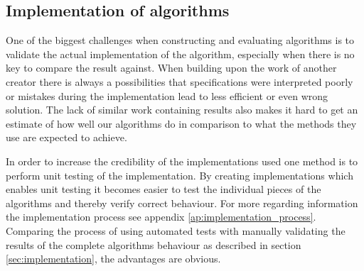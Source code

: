 \subsection{Implementation of algorithms }
One of the biggest challenges when constructing and evaluating algorithms is to validate the actual implementation of the algorithm, especially when there is no key to compare the result against. When building upon the work of another creator there is always a possibilities that specifications were interpreted poorly or mistakes during the implementation lead to less efficient or even wrong solution. The lack of similar work containing results also makes it hard to get an estimate of how well our algorithms do in comparison to what the methods they use are expected to achieve.

In order to increase the credibility of the implementations used one method is to perform unit testing of the implementation. By creating implementations which enables unit testing it becomes easier to test the individual pieces of the algorithms and thereby verify correct behaviour. For more regarding information the implementation process see appendix \ref{ap:implementation_process}. Comparing the process of using automated tests with manually validating the results of the complete algorithms behaviour as described in section \ref{sec:implementation}, the advantages are obvious.
